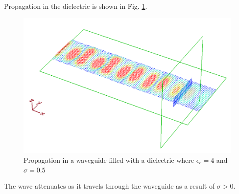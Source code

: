 Propagation in the dielectric is shown in Fig. \ref{fig:Task3-3d-animation}.

\begin{figure}[tbph]
	\centering
	\includegraphics[width=0.7\linewidth]{graphics/Task3-3d-animation}
	\caption{Propagation in a waveguide filled with a dielectric where $\epsilon_r = 4$ and $\sigma = 0.5$}
	\label{fig:Task3-3d-animation}
\end{figure}

The wave attenuates as it travels through the waveguide as a result of $\sigma > 0$.
